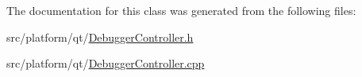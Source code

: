 The documentation for this class was generated from the following files\+:\begin{DoxyCompactItemize}
\item 
src/platform/qt/\mbox{\hyperlink{_debugger_controller_8h}{Debugger\+Controller.\+h}}\item 
src/platform/qt/\mbox{\hyperlink{_debugger_controller_8cpp}{Debugger\+Controller.\+cpp}}\end{DoxyCompactItemize}
